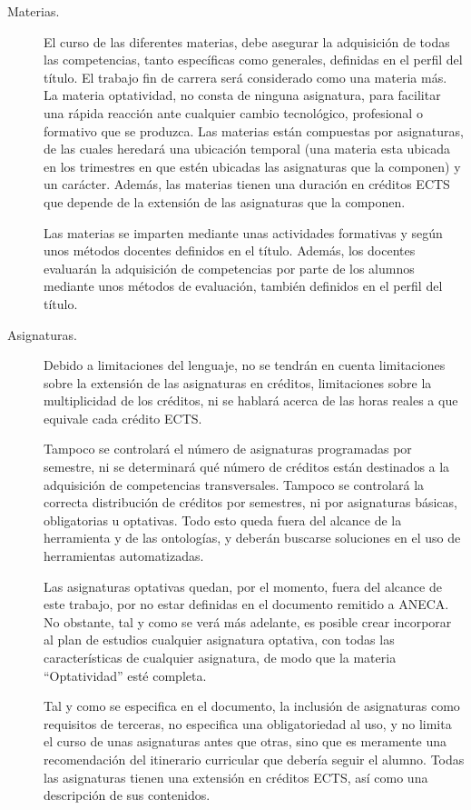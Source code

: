 \begin{description}
	\item [Materias.]El curso de las diferentes materias, debe asegurar la adquisición de todas las competencias, tanto específicas como generales, definidas en el perfil del título. El trabajo fin de carrera será considerado como una materia más. La materia optatividad, no consta de ninguna asignatura, para facilitar una rápida reacción ante cualquier cambio tecnológico, profesional o formativo que se produzca. Las materias están compuestas por asignaturas, de las cuales heredará una ubicación temporal (una materia esta ubicada en los trimestres en que estén ubicadas las asignaturas que la componen) y un carácter. Además, las materias tienen una duración en créditos ECTS que depende de la extensión de las asignaturas que la componen.
 
	Las materias se imparten mediante unas actividades formativas y según unos métodos docentes definidos en el título. Además, los docentes evaluarán la adquisición de competencias por parte de los alumnos mediante unos métodos de evaluación, también definidos en el perfil del título.
 
	\item [Asignaturas.]Debido a limitaciones del lenguaje, no se tendrán en cuenta limitaciones sobre la extensión de las asignaturas en créditos, limitaciones sobre la multiplicidad de los créditos, ni se hablará acerca de las horas reales a que equivale cada crédito ECTS. 
 
	Tampoco se controlará el número de asignaturas programadas por semestre, ni se determinará qué número de créditos están destinados a la adquisición de competencias transversales. Tampoco se controlará la correcta distribución de créditos por semestres, ni por asignaturas básicas, obligatorias u optativas. Todo esto queda fuera del alcance de la herramienta y de las ontologías, y deberán buscarse soluciones en el uso de herramientas automatizadas.
	
	Las asignaturas optativas quedan, por el momento, fuera del alcance de este trabajo, por no estar definidas en el documento remitido a ANECA. No obstante, tal y como se verá más adelante, es posible crear incorporar al plan de estudios cualquier asignatura optativa, con todas las características de cualquier asignatura, de modo que la materia ``Optatividad'' esté completa. 
	
	Tal y como se especifica en el documento, la inclusión de asignaturas como requisitos de terceras, no especifica una obligatoriedad al uso, y no limita el curso de unas asignaturas antes que otras, sino que es meramente una recomendación del itinerario curricular que debería seguir el alumno. Todas las asignaturas tienen una extensión en créditos ECTS, así como una descripción de sus contenidos.
 

\end{description}
